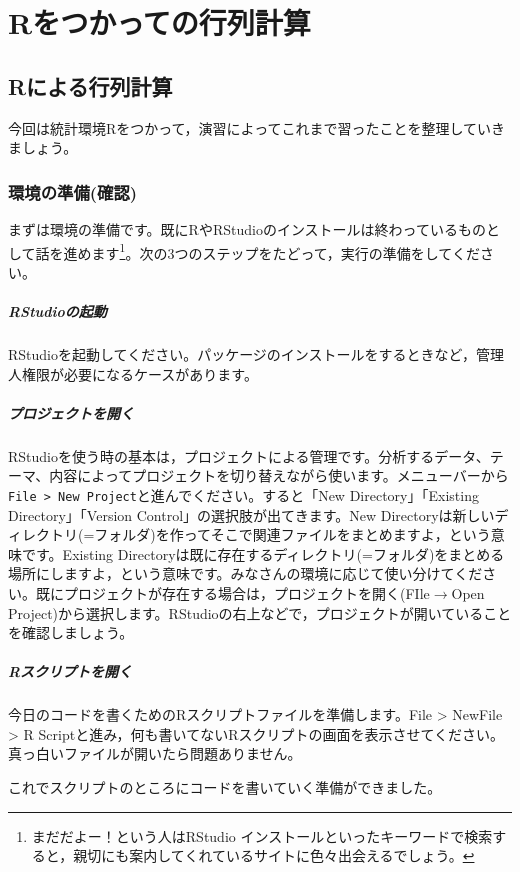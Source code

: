 \documentclass{ltjsbook}
\begin{document}
 
\chapter{Rをつかっての行列計算} 
\label{chapter9}
\section{Rによる行列計算}

今回は統計環境Rをつかって，演習によってこれまで習ったことを整理していきましょう。
\subsection{環境の準備(確認)}
まずは環境の準備です。既にRやRStudioのインストールは終わっているものとして話を進めます\footnote{まだだよー！という人はRStudio インストールといったキーワードで検索すると，親切にも案内してくれているサイトに色々出会えるでしょう。}。次の3つのステップをたどって，実行の準備をしてください。
\paragraph{RStudioの起動}RStudioを起動してください。パッケージのインストールをするときなど，管理人権限が必要になるケースがあります。
\paragraph{プロジェクトを開く}\label{UnderProject}RStudioを使う時の基本は，プロジェクトによる管理です。分析するデータ、テーマ、内容によってプロジェクトを切り替えながら使います。メニューバーから\verb|File > New Project|と進んでください。すると「New Directory」「Existing Directory」「Version Control」の選択肢が出てきます。New Directoryは新しいディレクトリ(=フォルダ)を作ってそこで関連ファイルをまとめますよ，という意味です。Existing Directoryは既に存在するディレクトリ(=フォルダ)をまとめる場所にしますよ，という意味です。みなさんの環境に応じて使い分けてください。既にプロジェクトが存在する場合は，プロジェクトを開く(FIle$\to$Open Project)から選択します。RStudioの右上などで，プロジェクトが開いていることを確認しましょう。
\paragraph{Rスクリプトを開く}今日のコードを書くためのRスクリプトファイルを準備します。File > NewFile > R Scriptと進み，何も書いてないRスクリプトの画面を表示させてください。真っ白いファイルが開いたら問題ありません。

これでスクリプトのところにコードを書いていく準備ができました。
\end{document}
